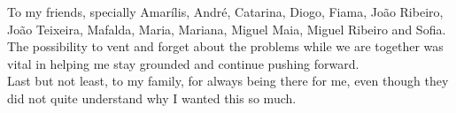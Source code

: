 To my friends, specially Amarílis, André, Catarina, Diogo, Fiama, João Ribeiro, João Teixeira, Mafalda, Maria, Mariana, Miguel Maia, Miguel Ribeiro and Sofia. The possibility to vent and forget about the problems while we are together was vital in helping me stay grounded and continue pushing forward.\\

Last but not least, to my family, for always being there for me, even though they did not quite understand why I wanted this so much. \\

\vspace{10mm}
